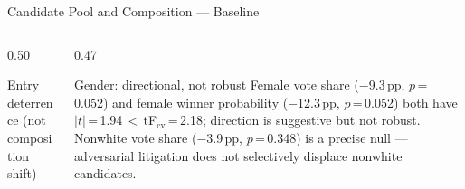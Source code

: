 \documentclass[aspectratio=169,10pt]{beamer}
\begin{document}
\begin{frame}{Candidate Pool and Composition --- Baseline}
\begin{columns}[T]
\begin{column}{0.50\textwidth}
\begin{block}{Entry deterrence (not composition shift)}
\end{block}
\end{column}
\begin{column}{0.47\textwidth}
\begin{alertblock}{Gender: directional, not robust}
  \footnotesize
  Female vote share ($-$9.3\,pp, $p$\,=\,0.052) and female winner probability ($-$12.3\,pp, $p$\,=\,0.052) both have $|t|$\,=\,1.94\,$<$\,tF$_\text{cv}$\,=\,2.18; direction is suggestive but not robust. Nonwhite vote share ($-$3.9\,pp, $p$\,=\,0.348) is a precise null --- adversarial litigation does not selectively displace nonwhite candidates.
\end{alertblock}
\end{column}
\end{columns}
\end{frame}
\end{document}
